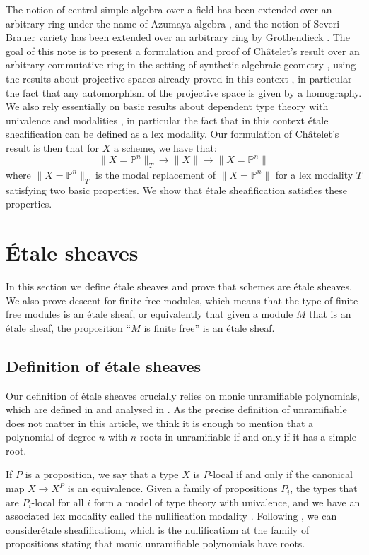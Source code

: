\documentclass[10pt,a4paper]{article}
\theoremstyle{definition}
\newcommand{\propTrunc}[1]{\lVert #1 \rVert}
\newcommand{\bP}{\mathbb{P}}
\begin{document}
The notion of central simple algebra over a field has been extended over an arbitrary ring under the name of Azumaya algebra \cite{azumaya51}, and the notion of Severi-Brauer variety has been extended over an arbitrary ring by Grothendieck \cite{grothendieck68}.
The goal of this note is to present a formulation and proof of Ch\^atelet's result over an arbitrary commutative ring
in the setting of synthetic algebraic geometry \cite{draft}, using the results about projective
spaces already proved in this context \cite{sag-projective}, in particular the fact that any automorphism of the projective space is given by a homography. We also rely essentially on basic results about dependent type theory with univalence \cite{hott}
and modalities \cite{modalities}, in particular the fact that in this context \'etale sheafification can be defined
as a lex modality. Our formulation of Ch\^atelet's result is then that for $X$ a scheme, we have that:
\[\propTrunc{X=\bP^n}_{T} \to \propTrunc{X} \to \propTrunc{X=\bP^n}\]
where $\propTrunc{X=\bP^n}_{T}$ is the modal replacement of $\propTrunc{X=\bP^n}$ for a lex modality $T$ satisfying two basic properties. We show that \'etale sheafification satisfies these properties.



\section{\'Etale sheaves}
\label{etale-sheaves}

In this section we define étale sheaves and prove that schemes are étale sheaves. We also prove descent for finite free modules, which means that the type of finite free modules is an étale sheaf, or equivalently that given a module $M$ that is an étale sheaf, the proposition ``$M$ is finite free'' is an étale sheaf.


\subsection{Definition of étale sheaves}

Our definition of étale sheaves crucially relies on monic unramifiable polynomials, which are defined in \cite{wraith79} and analysed in \cite{coqazumaya}. As the precise definition of unramifiable does not matter in this article, we think it is enough to mention that a polynomial of degree $n$ with $n$ roots in unramifiable if and only if it has a simple root.

If $P$ is a proposition, we say that a type $X$ is $P$-local if and only if the canonical map $X\to X^P$ is an equivalence.
Given a family of propositions $P_i$, the types that are $P_i$-local for all $i$ form a model of type theory with univalence,
and we have an associated lex modality called the nullification modality \cite{modalities,Quirin16}.
Following \cite{wraith79}, we can consider\'etale sheafificatiom, which is the nullificatiom at the family of propositions stating that monic unramifiable polynomials have roots.
\end{document}
